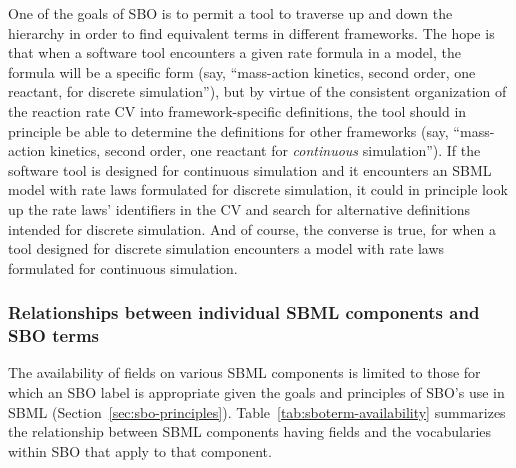 

One of the goals of SBO is to permit a tool to traverse up and
down the hierarchy in order to find equivalent terms in different
frameworks.  The hope is that when a software tool encounters a
given rate formula in a model, the formula will be a specific form
(say, ``mass-action kinetics, second order, one reactant, for
discrete simulation''), but by virtue of the consistent
organization of the reaction rate CV into framework-specific
definitions, the tool should in principle be able to determine the
definitions for other frameworks (say, ``mass-action kinetics,
second order, one reactant for \emph{continuous} simulation'').
If the software tool is designed for continuous simulation and it
encounters an SBML model with rate laws formulated for discrete
simulation, it could in principle look up the rate laws'
identifiers in the CV and search for alternative definitions
intended for discrete simulation.  And of course, the converse is
true, for when a tool designed for discrete simulation encounters
a model with rate laws formulated for continuous simulation.


\subsubsection{Relationships between individual SBML components and SBO terms}

The availability of  fields on various SBML
components is limited to those for which an SBO label is
appropriate given the goals and principles of SBO's use in SBML
(Section~\ref{sec:sbo-principles}).
Table~\ref{tab:sboterm-availability} summarizes the relationship
between SBML components having  fields and the
vocabularies within SBO that apply to that component.



